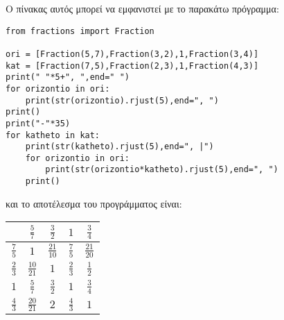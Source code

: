 Ο πίνακας αυτός μπορεί να εμφανιστεί με το παρακάτω πρόγραμμα:

\begin{lstlisting}
from fractions import Fraction

ori = [Fraction(5,7),Fraction(3,2),1,Fraction(3,4)]
kat = [Fraction(7,5),Fraction(2,3),1,Fraction(4,3)]
print(" "*5+", ",end=" ")
for orizontio in ori:
    print(str(orizontio).rjust(5),end=", ")
print()
print("-"*35)
for katheto in kat:
    print(str(katheto).rjust(5),end=", |")
    for orizontio in ori:
        print(str(orizontio*katheto).rjust(5),end=", ")
    print()
\end{lstlisting}
και το αποτέλεσμα του προγράμματος είναι:
\begin{table}
\begin{tabular}{|c|c|c|c|c|}
                        & $\frac{5}{7}$   & $\frac{3}{2}$    & $1$                & $\frac{3}{4}$\\\hline
$\frac{7}{5}$&    $1$                   &$\frac{21}{10}$&$\frac{7}{5}$&$\frac{21}{20}$\\\hline
$\frac{2}{3}$&$\frac{10}{21}$ & $1$                      & $\frac{2}{3}$&  $\frac{1}{2}$      \\\hline
$1$                  &$\frac{5}{7}$     & $\frac{3}{2}$    &     $1$               &   $\frac{3}{4}$      \\\hline
$\frac{4}{3}$&  $ \frac{20}{21}$& $2$                   &      $\frac{4}{3}$ &  $1$ \\\hline
\end{tabular}
\end{table}

